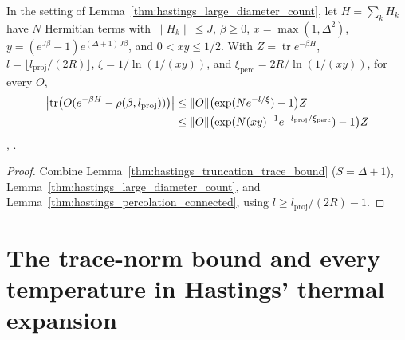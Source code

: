\begin{lemma}
    \label{thm:hastings_percolation_large_diameter}
    \leanok
    In the setting of Lemma~\ref{thm:hastings_large_diameter_count}, let
    $H=\sum_kH_k$ have $N$ Hermitian terms with $\|H_k\|\le J$, $\beta\ge0$,
    $x=\max(1,\Delta^2)$, $y=(e^{J\beta}-1)e^{(\Delta+1)J\beta}$, and
    $0<xy\le1/2$. With $Z=\operatorname{tr}e^{-\beta H}$,
    $l=\lfloor l_{\mathrm{proj}}/(2R)\rfloor$, $\xi=1/\ln(1/(xy))$, and
    $\xi_{\mathrm{perc}}=2R/\ln(1/(xy))$, for every $O$,
    \begin{align}
        \bigl|\operatorname{tr}\bigl(O(e^{-\beta H}-\rho(\beta,l_{\mathrm{proj}}))\bigr)\bigr|
         & \le\|O\|\bigl(\exp(Ne^{-l/\xi})-1\bigr)Z
        \notag                                                                               \\
         & \le\|O\|\bigl(\exp(N(xy)^{-1}e^{-l_{\mathrm{proj}}/\xi_{\mathrm{perc}}})-1\bigr)Z
        \label{eq:hastings_percolation_large_diameter}
    \end{align}
    \cite[eq.~(perc2), lines 1227--1254]{Hastings2006Solving},
    \cite{gap:hastings05_percolation_cluster_size,gap:hastings05_cluster_boundary}.
\end{lemma}
\begin{proof}
    \leanok
    Combine Lemma~\ref{thm:hastings_truncation_trace_bound} ($S=\Delta+1$),
    Lemma~\ref{thm:hastings_large_diameter_count}, and
    Lemma~\ref{thm:hastings_percolation_connected}, using
    $l\ge l_{\mathrm{proj}}/(2R)-1$.
\end{proof}

\section{The trace-norm bound and every temperature in Hastings' thermal expansion}
\label{sec:hastings_thermal_trace_norm}


